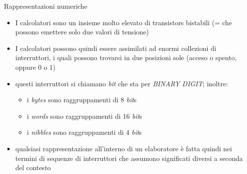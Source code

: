 %
%
%
%
%
\setcounter{ms}{1}
\begin{slide}{Rappresentazioni numeriche}
{\scriptsize
	\begin{itemize}

		\item I calcolatori sono un insieme molto elevato di transistors
			bistabili (= che possono emettere solo due valori di tensione)

		\item I calcolatori possono quindi essere assimilati ad
			enormi collezioni di interruttori,
			i quali possono trovarsi in due posizioni sole
			(acceso o spento, oppure 0 o 1)

		\item questi interruttori si chiamano \emph{bit}
			che sta per \emph{BINARY DIGIT}; inoltre:

		\begin{itemize}

			\item i \emph{bytes} sono raggruppamenti di 8 \emph{bit}s
			\item i \emph{words} sono raggruppamenti di 16 \emph{bit}s
			\item i \emph{nibbles} sono raggruppamenti di 4 \emph{bit}s

		\end{itemize}

		\item qualsiasi rappresentazione all'interno di
			un elaboratore \`e fatta quindi nei termini
			di sequenze di interruttori che assumono significati
			diversi a seconda del contesto

	\end{itemize}
}
\end{slide}

